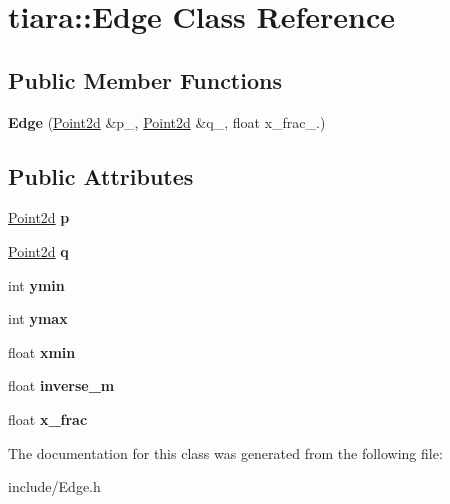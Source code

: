 \hypertarget{classtiara_1_1Edge}{}\section{tiara\+::Edge Class Reference}
\label{classtiara_1_1Edge}
\subsection*{Public Member Functions}
\begin{DoxyCompactItemize}
\item 
\mbox{\label{classtiara_1_1Edge_af57d62f6743242f53d3c4404416c5971}} 
{\bfseries Edge} (\mbox{\hyperlink{classtiara_1_1Point2d}{Point2d}} \&p\+\_\+, \mbox{\hyperlink{classtiara_1_1Point2d}{Point2d}} \&q\+\_\+, float x\+\_\+frac\+\_.)
\end{DoxyCompactItemize}
\subsection*{Public Attributes}
\begin{DoxyCompactItemize}
\item 
\mbox{\label{classtiara_1_1Edge_a3e2c0077894d68c07e4d9ee186814315}} 
\mbox{\hyperlink{classtiara_1_1Point2d}{Point2d}} {\bfseries p}
\item 
\mbox{\label{classtiara_1_1Edge_aeece964f066ca393424c4159010298b0}} 
\mbox{\hyperlink{classtiara_1_1Point2d}{Point2d}} {\bfseries q}
\item 
\mbox{\label{classtiara_1_1Edge_a0f2632706b8ab6dcc81f03f577bf568e}} 
int {\bfseries ymin}
\item 
\mbox{\label{classtiara_1_1Edge_ad4e2b6d2dcb02e3c95a63011a4c13b15}} 
int {\bfseries ymax}
\item 
\mbox{\label{classtiara_1_1Edge_a81fa56e1f4d0e5f378267e2d1d04b7aa}} 
float {\bfseries xmin}
\item 
\mbox{\label{classtiara_1_1Edge_a50068dd75275ee9a3b9f9db2a387389e}} 
float {\bfseries inverse\+\_\+m}
\item 
\mbox{\label{classtiara_1_1Edge_ae9460ea45ec230c9833c080b5a0c4d91}} 
float {\bfseries x\+\_\+frac}
\end{DoxyCompactItemize}


The documentation for this class was generated from the following file\+:\begin{DoxyCompactItemize}
\item 
include/Edge.\+h\end{DoxyCompactItemize}
